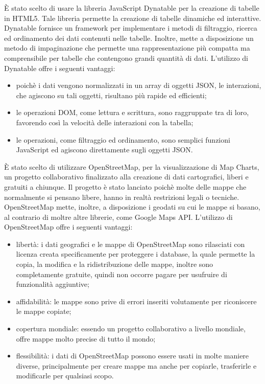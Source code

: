 È stato scelto di usare la libreria JavaScript Dynatable per la creazione di tabelle in HTML5. Tale libreria permette la creazione di tabelle dinamiche ed interattive. Dynatable fornisce un framework per implementare i metodi di filtraggio, ricerca ed ordinamento dei dati contenuti nelle tabelle. Inoltre, mette a disposizione un metodo di impaginazione che permette una rappresentazione più compatta ma comprensibile per tabelle che contengono grandi quantità di dati.
L'utilizzo di Dynatable offre i seguenti vantaggi:
\begin{itemize}
\item poichè i dati vengono normalizzati in un array di oggetti JSON, le interazioni, che agiscono su tali oggetti, risultano più rapide ed efficienti;
\item le operazioni DOM, come lettura e scrittura, sono raggruppate tra di loro, favorendo così la velocità delle interazioni con la tabella;
\item le operazioni, come filtraggio ed ordinamento, sono semplici funzioni JavaScript ed agiscono direttamente sugli oggetti JSON.
\end{itemize}

È stato scelto di utilizzare OpenStreetMap, per la visualizzazione di Map Charts, un progetto collaborativo finalizzato alla creazione di dati cartografici, liberi e gratuiti a chiunque. Il progetto è stato lanciato poichè molte delle mappe che normalmente si pensano libere, hanno in realtà restrizioni legali o tecniche. OpenStreetMap mette, inoltre, a disposizione i geodati su cui le mappe si basano, al contrario di moltre altre librerie, come Google Maps API.
L'utilizzo di OpenStreetMap offre i seguenti vantaggi:
\begin{itemize}
\item libertà: i dati geografici e le mappe di OpenStreetMap sono rilasciati con licenza creata specificamente per proteggere i database, la quale permette la copia, la modifica e la ridistribuzione delle mappe, inoltre sono completamente gratuite, quindi non occorre pagare per usufruire di funzionalità aggiuntive;
\item affidabilità: le mappe sono prive di errori inseriti volutamente per riconiscere le mappe copiate;
\item copertura mondiale: essendo un progetto collaborativo a livello mondiale, offre mappe molto precise di tutto il mondo;
\item flessibilità: i dati di OpenStreetMap possono essere usati in molte maniere diverse, principalmente per creare mappe ma anche per copiarle, trasferirle e modificarle per qualsiasi scopo.
\end{itemize}


